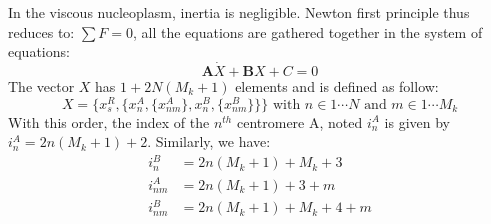 \documentclass[a4paper,12pt]{article}
\begin{document}
In the viscous nucleoplasm, inertia is negligible. Newton first
principle thus reduces to: $ \sum F = 0 $, all the equations are
gathered together in the system of equations:
$$
\mathbf{A}\dot{X} + \mathbf{B}X + C = 0
$$
The vector $X$ has $1 + 2N(M_k + 1)$ elements and is defined as follow:
\begin{equation*}
  X = \{x_s^R, \{x_n^A, \{x_{nm}^A\},  x_n^B,%
  \{x_{nm}^B \}\}\}\mbox{ with } n \in 1 \cdots N %
  \mbox{ and } m \in 1 \cdots M_k
\end{equation*}
With this order, the index of the $n^{th}$ centromere A, noted
$i_{n}^A$ is given by $i_{n}^A = 2n(M_k+1) + 2$. Similarly, we have:
$$ \begin{aligned}
i_{n}^B &= 2n(M_k+1) + M_k + 3 \\
i_{nm}^A &= 2n(M_k+1) + 3 + m \\
i_{nm}^B &= 2n(M_k+1) + M_k + 4 + m \\
\end{aligned}$$
\end{document}
